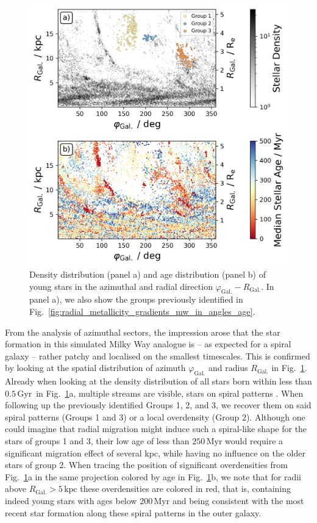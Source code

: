 \documentclass[twocolumn,apj,numberedappendix,appendixfloats,twocolappendix]{openjournal}
\newcommand{\nihaoAGEmax}{$0.5\,\mathrm{Gyr}$}
\begin{document}
\begin{CJK*}{UTF8}{gbsn}
\begin{figure}
    \centering
    \includegraphics[width=\columnwidth]{figures/phi_angle_R_follow_up.png}
    \caption{Density distribution (panel a) and age distribution (panel b) of young stars in the azimuthal and radial direction $\varphi_\mathrm{Gal.}-R_\mathrm{Gal.}$. In panel a), we also show the groups previously identified in Fig.~\ref{fig:radial_metallicity_gradients_mw_in_angles_age}.}
    \label{fig:phi_angle_R_follow_up}
\end{figure}

From the analysis of azimuthal sectors, the impression arose that the star formation in this simulated Milky Way analogue is -- as expected for a spiral galaxy -- rather patchy and localised on the smallest timescales. This is confirmed by looking at the spatial distribution of azimuth $\varphi_\mathrm{Gal.}$ and radius $R_\mathrm{Gal.}$ in Fig.~\ref{fig:phi_angle_R_follow_up}. Already when looking at the density distribution of all stars born within less than \nihaoAGEmax\ in Fig.~\ref{fig:phi_angle_R_follow_up}a, multiple streams are visible, stars on spiral patterns \citep[see also][]{Kreckel2019, Chen2024b}. When following up the previously identified Groups 1, 2, and 3, we recover them on said spiral patterns (Groups 1 and 3) or a local overdensity (Group 2). Although one could imagine that radial migration might induce such a spiral-like shape for the stars of groups 1 and 3, their low age of less than $250\,\mathrm{Myr}$ would require a significant migration effect of several kpc, while having no influence on the older stars of group 2. When tracing the position of significant overdensities from Fig.~\ref{fig:phi_angle_R_follow_up}a in the same projection colored by age in Fig.~\ref{fig:phi_angle_R_follow_up}b, we note that for radii above $R_\mathrm{Gal.} > 5\,\mathrm{kpc}$ these overdensities are colored in red, that is, containing indeed young stars with ages below $200\,\mathrm{Myr}$ and being consistent with the most recent star formation along these spiral patterns in the outer galaxy.


\end{CJK*}
\end{document}
